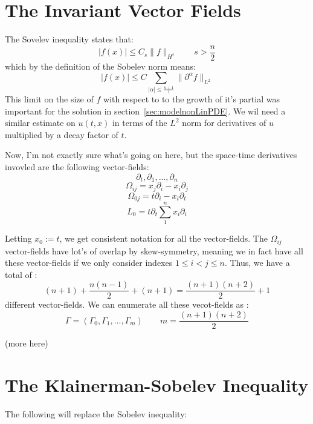 \documentclass{book}
\begin{document}
\section{The Invariant Vector Fields}


The Sovelev inequality states that:
\[
	|f(x)| \le C_s\|f\|_{H^s} \qquad s > \frac{n}{2}
\]
which by the definition of the Sobelev norm means:
\[
	|f(x)| \le C \sum_{|\alpha| \le \frac{n+1}{1}} \|  \partial^\alpha f\|_{L^2}
\]
This limit on the size of $f$ with respect to to the growth of it's partial was important for the solution in
section~\ref{sec:modelnonLinPDE}. We wil need a similar estimate on $u(t,x)$ in terms of the $L^2$ norm  for derivatives
of $u$ multiplied by a decay factor of $t$.

Now, I'm not exactly sure what's going on here, but the space-time derivatives invovled are the following vector-fields:
\begin{equation}\label{eq:invariantVecFieldI}
   \partial_t,  \partial_1, ...,  \partial_n
\end{equation}
\begin{equation}\label{eq:invariantVecFieldII}
	\Omega_{ij} = x_j  \partial_i - x_i  \partial_j
\end{equation}
\begin{equation}\label{eq:invariantVecFieldIII}
	\Omega_{0j} = t  \partial_i - x_i  \partial_t
\end{equation}
\begin{equation}\label{eq:invariantVecFieldIV}
	L_0 = t  \partial_t \sum_1^n x_i  \partial_i
\end{equation}

Letting $x_0 := t$, we get consistent notation for all the vector-fields. The $\Omega_{ij}$ vector-fields have lot's of
overlap by skew-symmetry, meaning we in fact have all these vector-fields if we only consider indexes $1 \le i < j \le
n$. Thus, we have a total of :
\[
	(n+1) + \frac{n(n-1)}{2} + (n+1) = \frac{(n+1)(n+2)}{2} + 1
\]
different vector-fields. We can enumerate all these vecot-fields as :
\[
	\Gamma = (\Gamma_0, \Gamma_1, ..., \Gamma_m)  \qquad m = \frac{(n+1)(n+2)}{2}
\]

(more here)

\section{The Klainerman-Sobelev Inequality}

The following will replace the Sobelev inequality:
\end{document}
